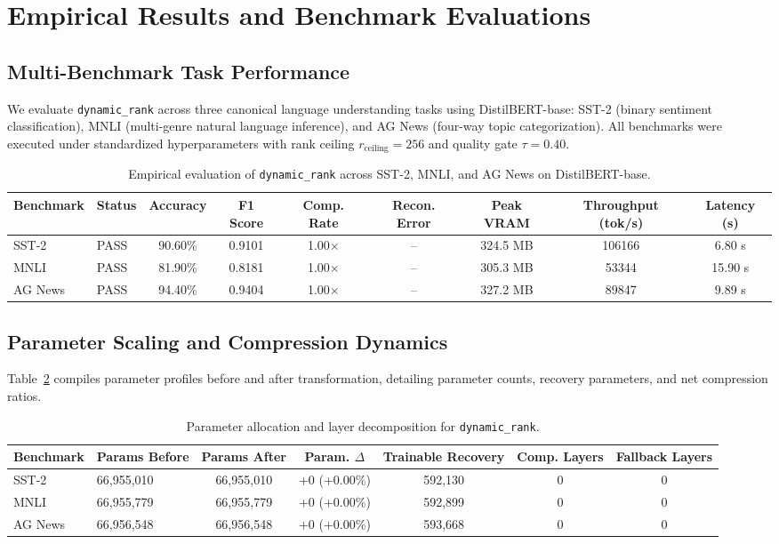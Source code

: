 \section{Empirical Results and Benchmark Evaluations}
\label{sec:results}

\subsection{Multi-Benchmark Task Performance}
We evaluate \texttt{dynamic\_rank} across three canonical language understanding tasks using DistilBERT-base: SST-2 (binary sentiment classification), MNLI (multi-genre natural language inference), and AG News (four-way topic categorization). All benchmarks were executed under standardized hyperparameters with rank ceiling $r_{\mathrm{ceiling}} = 256$ and quality gate $\tau = 0.40$.

\begin{table}[t]
\centering
\small
\begin{tabular}{llccccccc}
\toprule
\textbf{Benchmark} & \textbf{Status} & \textbf{Accuracy} & \textbf{F1 Score} & \textbf{Comp. Rate} & \textbf{Recon. Error} & \textbf{Peak VRAM} & \textbf{Throughput (tok/s)} & \textbf{Latency (s)} \\
\midrule
SST-2 & PASS & 90.60\% & 0.9101 & 1.00$\times$ & -- & 324.5 MB & 106166 & 6.80 s \\
MNLI & PASS & 81.90\% & 0.8181 & 1.00$\times$ & -- & 305.3 MB & 53344 & 15.90 s \\
AG News & PASS & 94.40\% & 0.9404 & 1.00$\times$ & -- & 327.2 MB & 89847 & 9.89 s \\
\bottomrule
\end{tabular}
\caption{Empirical evaluation of \texttt{dynamic\_rank} across SST-2, MNLI, and AG News on DistilBERT-base.}
\label{tab:results\_dynamic\_rank}
\end{table}

\subsection{Parameter Scaling and Compression Dynamics}
Table~\ref{tab:params\_dynamic\_rank} compiles parameter profiles before and after transformation, detailing parameter counts, recovery parameters, and net compression ratios.

\begin{table}[t]
\centering
\small
\begin{tabular}{llccccc}
\toprule
\textbf{Benchmark} & \textbf{Params Before} & \textbf{Params After} & \textbf{Param. $\Delta$} & \textbf{Trainable Recovery} & \textbf{Comp. Layers} & \textbf{Fallback Layers} \\
\midrule
SST-2 & 66,955,010 & 66,955,010 & +0 (+0.00\%) & 592,130 & 0 & 0 \\
MNLI & 66,955,779 & 66,955,779 & +0 (+0.00\%) & 592,899 & 0 & 0 \\
AG News & 66,956,548 & 66,956,548 & +0 (+0.00\%) & 593,668 & 0 & 0 \\
\bottomrule
\end{tabular}
\caption{Parameter allocation and layer decomposition for \texttt{dynamic\_rank}.}
\label{tab:params\_dynamic\_rank}
\end{table}

